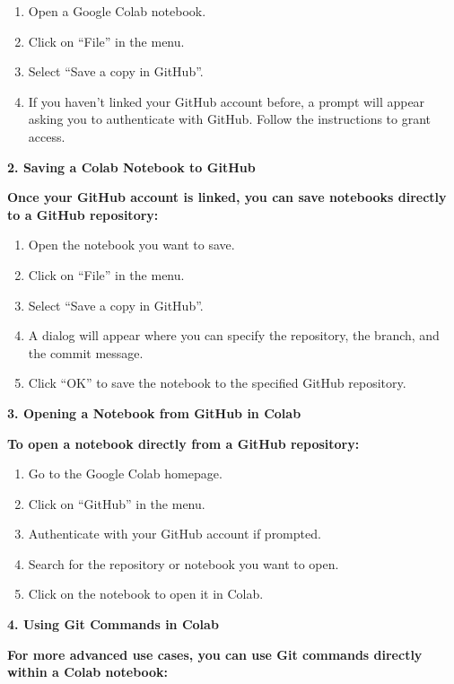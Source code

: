 \documentclass[
  letterpaper,
  DIV=11,
  numbers=noendperiod]{scrreprt}
\begin{document}
\begin{enumerate}
\def\labelenumi{\alph{enumi}.}
\item
  Open a Google Colab notebook.
\item
  Click on ``File'' in the menu.
\item
  Select ``Save a copy in GitHub''.
\item
  If you haven't linked your GitHub account before, a prompt will appear
  asking you to authenticate with GitHub. Follow the instructions to
  grant access.
\end{enumerate}

\textbf{2. Saving a Colab Notebook to GitHub}

\textbf{Once your GitHub account is linked, you can save notebooks
directly to a GitHub repository:}

\begin{enumerate}
\def\labelenumi{\alph{enumi}.}
\item
  Open the notebook you want to save.
\item
  Click on ``File'' in the menu.
\item
  Select ``Save a copy in GitHub''.
\item
  A dialog will appear where you can specify the repository, the branch,
  and the commit message.
\item
  Click ``OK'' to save the notebook to the specified GitHub repository.
\end{enumerate}

\textbf{3. Opening a Notebook from GitHub in Colab}

\textbf{To open a notebook directly from a GitHub repository:}

\begin{enumerate}
\def\labelenumi{\alph{enumi}.}
\item
  Go to the Google Colab homepage.
\item
  Click on ``GitHub'' in the menu.
\item
  Authenticate with your GitHub account if prompted.
\item
  Search for the repository or notebook you want to open.
\item
  Click on the notebook to open it in Colab.
\end{enumerate}

\textbf{4. Using Git Commands in Colab}

\textbf{For more advanced use cases, you can use Git commands directly
within a Colab notebook:}
\end{document}
